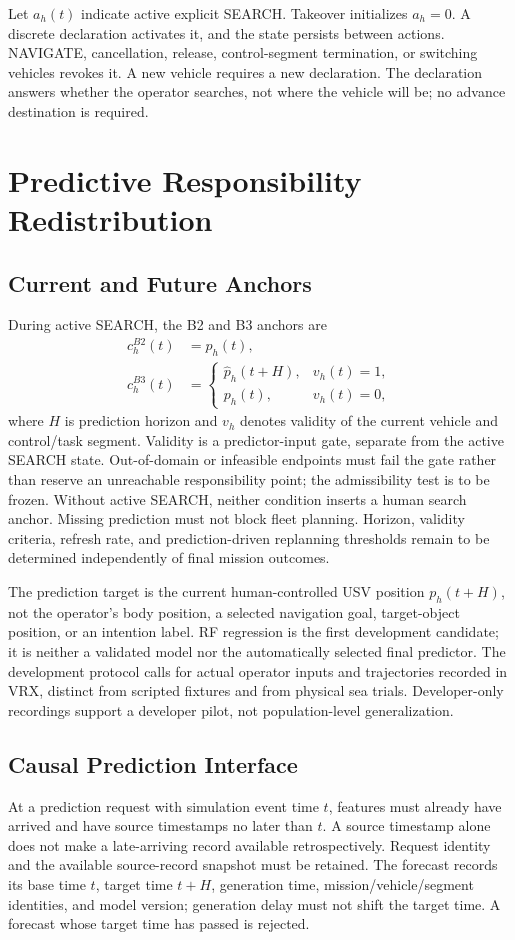 \documentclass[conference]{IEEEtran}
\begin{document}
Let $a_h(t)$ indicate active explicit SEARCH. Takeover initializes $a_h=0$. A discrete declaration activates it, and the state persists between actions. NAVIGATE, cancellation, release, control-segment termination, or switching vehicles revokes it. A new vehicle requires a new declaration. The declaration answers whether the operator searches, not where the vehicle will be; no advance destination is required.

\section{Predictive Responsibility Redistribution}
\subsection{Current and Future Anchors}
During active SEARCH, the B2 and B3 anchors are
\begin{align}
 c_h^{B2}(t)&=p_h(t),\\
 c_h^{B3}(t)&=\begin{cases}\hat p_h(t+H),&v_h(t)=1,\\p_h(t),&v_h(t)=0,\end{cases}
\label{eq:anchor}
\end{align}
where $H$ is prediction horizon and $v_h$ denotes validity of the current vehicle and control/task segment. Validity is a predictor-input gate, separate from the active SEARCH state. Out-of-domain or infeasible endpoints must fail the gate rather than reserve an unreachable responsibility point; the admissibility test is to be frozen. Without active SEARCH, neither condition inserts a human search anchor. Missing prediction must not block fleet planning. Horizon, validity criteria, refresh rate, and prediction-driven replanning thresholds remain to be determined independently of final mission outcomes.

The prediction target is the current human-controlled USV position $p_h(t+H)$, not the operator's body position, a selected navigation goal, target-object position, or an intention label. RF regression is the first development candidate; it is neither a validated model nor the automatically selected final predictor. The development protocol calls for actual operator inputs and trajectories recorded in VRX, distinct from scripted fixtures and from physical sea trials. Developer-only recordings support a developer pilot, not population-level generalization.

\subsection{Causal Prediction Interface}
At a prediction request with simulation event time $t$, features must already have arrived and have source timestamps no later than $t$. A source timestamp alone does not make a late-arriving record available retrospectively. Request identity and the available source-record snapshot must be retained. The forecast records its base time $t$, target time $t+H$, generation time, mission/vehicle/segment identities, and model version; generation delay must not shift the target time. A forecast whose target time has passed is rejected.
\end{document}
